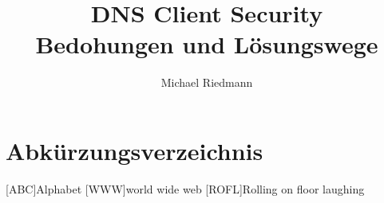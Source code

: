 \documentclass[Bachelor, BIC, german]{twbook}
\title{DNS Client Security\\Bedohungen und Lösungswege}
\author{Michael Riedmann}
\begin{document}
\maketitle

\listoftodos





















 

\clearpage

\listoffigures
\clearpage

\listoftables
\clearpage

\lstlistoflistings
\clearpage

{}
\chapter*{Abkürzungsverzeichnis}
\begin{acronym}[XXXXX]
    [ABC]{Alphabet}
    [WWW]{world wide web}
    [ROFL]{Rolling on floor laughing}
\end{acronym}




\end{document}
